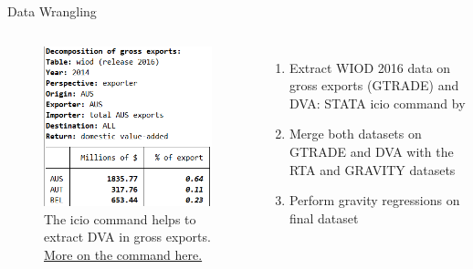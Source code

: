 \documentclass[10pt]{beamer}
\begin{document}
{
\begin{frame}{Data Wrangling}
\begin{columns}
      \begin{figure}
    \includegraphics[scale=0.6]{icio_dva.png} %
    \small{\caption{The icio command helps to extract DVA in gross exports.
    \href{http://www.tradeconomics.com/icio/}{More on the command here.}}}
  \end{figure}

\begin{enumerate}
    \item Extract WIOD 2016 data on gross exports (GTRADE) and DVA: STATA icio command by \cite{belotti2020icio}
    \item Merge both datasets on GTRADE and DVA with the RTA and GRAVITY datasets
    \item Perform gravity regressions on final dataset
\end{enumerate}
\end{columns}
\end{frame}
}
\end{document}
